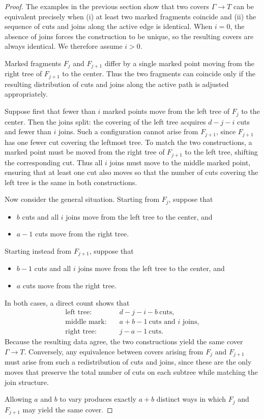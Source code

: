 \documentclass[11pt,reqno]{amsart}
\theoremstyle{definition}
\begin{document}
\begin{proof}
The examples in the previous section show that two covers $\Gamma \to T$ can 
be equivalent precisely when (i) at least two marked fragments coincide and 
(ii) the sequence of cuts and joins along the active edge is identical. When 
$i=0$, the absence of joins forces the construction to be unique, so the 
resulting covers are always identical. We therefore assume $i>0$.

Marked fragments $F_j$ and $F_{j+1}$ differ by a single marked point moving 
from the right tree of $F_{j+1}$ to the center. Thus the two fragments can 
coincide only if the resulting distribution of cuts and joins along the active 
path is adjusted appropriately.

Suppose first that fewer than $i$ marked points move from the left tree of 
$F_j$ to the center. Then the joins split: the covering of the left tree 
acquires $d - j - i$ cuts and fewer than $i$ joins. Such a configuration 
cannot arise from $F_{j+1}$, since $F_{j+1}$ has one fewer cut covering the 
leftmost tree. To match the two constructions, a marked point must be moved 
from the right tree of $F_{j+1}$ to the left tree, shifting the corresponding 
cut. Thus all $i$ joins must move to the middle marked point, ensuring that at 
least one cut also moves so that the number of cuts covering the left tree is 
the same in both constructions.

Now consider the general situation. Starting from $F_j$, suppose that
\begin{itemize}
    \item $b$ cuts and all $i$ joins move from the left tree to the center, and
    \item $a-1$ cuts move from the right tree.
\end{itemize}
Starting instead from $F_{j+1}$, suppose that
\begin{itemize}
    \item $b-1$ cuts and all $i$ joins move from the left tree to the center, and
    \item $a$ cuts move from the right tree.
\end{itemize}

In both cases, a direct count shows that
\[
\begin{aligned}
\text{left tree:} &\quad d - j - i - b \ \text{cuts},\\
\text{middle mark:} &\quad a + b - 1 \ \text{cuts and } i \text{ joins},\\
\text{right tree:} &\quad j - a - 1 \ \text{cuts}.
\end{aligned}
\]
Because the resulting data agree, the two constructions yield the same cover 
$\Gamma \to T$. Conversely, any equivalence between covers arising from 
$F_j$ and $F_{j+1}$ must arise from such a redistribution of cuts and joins, 
since these are the only moves that preserve the total number of cuts on each 
subtree while matching the join structure.

Allowing $a$ and $b$ to vary produces exactly $a+b$ distinct ways in which 
$F_j$ and $F_{j+1}$ may yield the same cover.
\end{proof}
\end{document}

